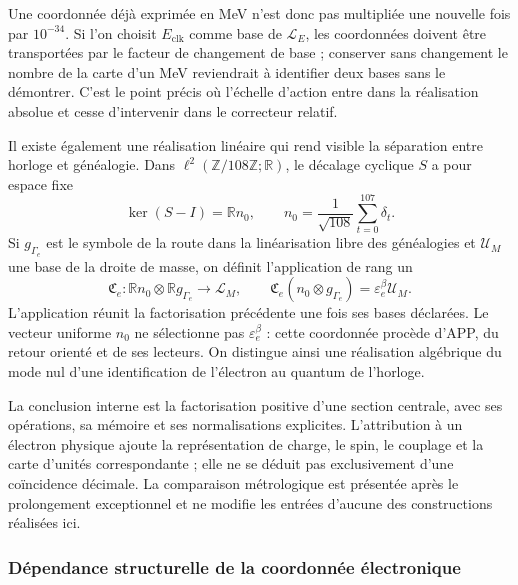 Une coordonnée déjà exprimée en MeV n'est donc pas multipliée une nouvelle fois par \(10^{-34}\). Si l'on choisit \(E_{\mathrm{clk}}\) comme base de \(\mathcal L_E\), les coordonnées doivent être transportées par le facteur de changement de base ; conserver sans changement le nombre de la carte d'un MeV reviendrait à identifier deux bases sans le démontrer. C'est le point précis où l'échelle d'action entre dans la réalisation absolue et cesse d'intervenir dans le correcteur relatif.

Il existe également une réalisation linéaire qui rend visible la séparation
entre horloge et généalogie. Dans
\(\ell^2(\mathbb Z/108\mathbb Z;\mathbb R)\), le décalage
cyclique \(S\) a pour espace fixe
\[
 \ker(S-I)=\mathbb R n_0,\qquad
 n_0=\frac1{\sqrt{108}}\sum_{t=0}^{107}\delta_t.
\]
Si \(g_{\Gamma_e}\) est le symbole de la route dans la linéarisation libre
des généalogies et \(\mathcal U_M\) une base de la droite de masse,
on définit l'application de rang un
\begin{equation}
 \mathfrak C_e:
 \mathbb R n_0\otimes\mathbb R g_{\Gamma_e}\longrightarrow\mathcal L_M,
 \qquad
 \mathfrak C_e(n_0\otimes g_{\Gamma_e})
 =\varepsilon_e^\beta\mathcal U_M.
 \label{x_reciprocidad:eq:el-rango-uno}
\end{equation}
L'application réunit la factorisation précédente une fois ses bases déclarées.
Le vecteur uniforme \(n_0\) ne sélectionne pas \(\varepsilon_e^\beta\) :
cette coordonnée procède d'APP, du retour orienté et de ses lecteurs.
On distingue ainsi une réalisation algébrique du mode nul d'une
identification de l'électron au quantum de l'horloge.

La conclusion interne est la factorisation positive d'une section
centrale, avec ses opérations, sa mémoire et ses normalisations explicites.
L'attribution à un électron physique ajoute la représentation de charge, le
spin, le couplage et la carte d'unités correspondante ; elle ne se
déduit pas exclusivement d'une coïncidence décimale. La comparaison
métrologique est présentée après le prolongement exceptionnel et ne modifie
les entrées d'aucune des constructions réalisées ici.


\subsubsection{Dépendance structurelle de la coordonnée électronique}


